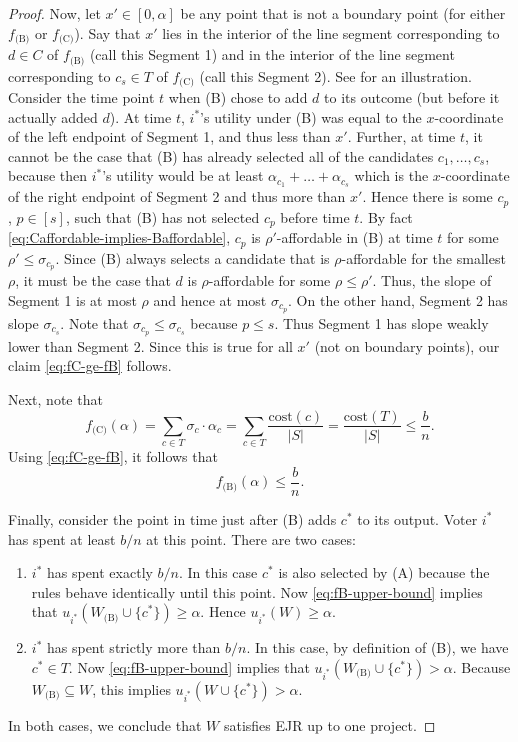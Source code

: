 \documentclass[10pt]{scrartcl}
\renewcommand*{\le}{\leqslant}
\renewcommand*{\ge}{\geqslant}
\newcommand{\cost}{{{\mathrm{cost}}}}
\theoremstyle{definition}
\theoremstyle{plain}
\begin{document}
\begin{proof}
	
	Now, let $x' \in [0, \alpha]$ be any point that is not a boundary point (for either $f_{\text{(B)}}$ or $f_{\text{(C)}}$). Say that $x'$ lies in the interior of the line segment corresponding to $d \in C$ of $f_{\text{(B)}}$ (call this Segment 1) and in the interior of the line segment corresponding to $c_s \in T$ of $f_{\text{(C)}}$ (call this Segment 2). See  for an illustration. Consider the time point $t$ when (B) chose to add $d$ to its outcome (but before it actually added $d$). At time $t$, $i^*$'s utility under (B) was equal to the $x$-coordinate of the left endpoint of Segment 1, and thus less than $x'$. Further, at time $t$, it cannot be the case that (B) has already selected all of the candidates $c_1, \dots, c_s$, because then $i^*$'s utility would be at least $\alpha_{c_1} + \dots + \alpha_{c_s}$ which is the $x$-coordinate of the right endpoint of Segment 2 and thus more than $x'$. Hence there is some $c_p$, $p \in [s]$, such that (B) has not selected $c_p$ before time $t$. 
	By fact \eqref{eq:Caffordable-implies-Baffordable}, $c_p$ is $\rho'$-affordable in (B) at time $t$ for some $\rho' \le \sigma_{c_p}$. Since (B) always selects a candidate that is $\rho$-affordable for the smallest $\rho$, it must be the case that $d$ is $\rho$-affordable for some $\rho \le \rho'$. Thus, the slope of Segment 1 is at most $\rho$ and hence at most $\sigma_{c_p}$. On the other hand, Segment 2 has slope $\sigma_{c_s}$. Note that $\sigma_{c_p} \le \sigma_{c_s}$ because $p \le s$. Thus Segment 1 has slope weakly lower than Segment 2. Since this is true for all $x'$ (not on boundary points), our claim \eqref{eq:fC-ge-fB} follows.
	
	
	Next, note that
	\[
	f_{\text{(C)}}(\alpha) = \sum_{c\in T} \sigma_c \cdot \alpha_c = \sum_{c\in T} \frac{\cost(c)}{|S|} = \frac{\cost(T)}{|S|} \le \frac{b}{n}.
	\]
	Using \eqref{eq:fC-ge-fB}, it follows that
	\begin{equation}
		\label{eq:fB-upper-bound}
		f_{\text{(B)}}(\alpha) \le \frac{b}{n}.
	\end{equation}
	
	Finally, consider the point in time just after (B) adds $c^*$ to its output. Voter $i^*$ has spent at least $b/n$ at this point. There are two cases:
	\begin{enumerate}
		\item[(i)] $i^*$ has spent exactly $b/n$. In this case $c^*$ is also selected by (A) because the rules behave identically until this point. Now \eqref{eq:fB-upper-bound} implies that $u_{i^*}(W_{\text{(B)}} \cup \{c^*\}) \ge \alpha$. Hence $u_{i^*}(W) \ge \alpha$.
		\item[(ii)] $i^*$ has spent strictly more than $b/n$. In this case, by definition of (B), we have $c^* \in T$. Now \eqref{eq:fB-upper-bound} implies that $u_{i^*}(W_{\text{(B)}} \cup \{c^*\}) > \alpha$. Because $W_{\text{(B)}} \subseteq W$, this implies $u_{i^*}(W \cup \{c^*\}) > \alpha$.
	\end{enumerate}
	In both cases, we conclude that $W$ satisfies EJR up to one project.
\end{proof}
\end{document}
